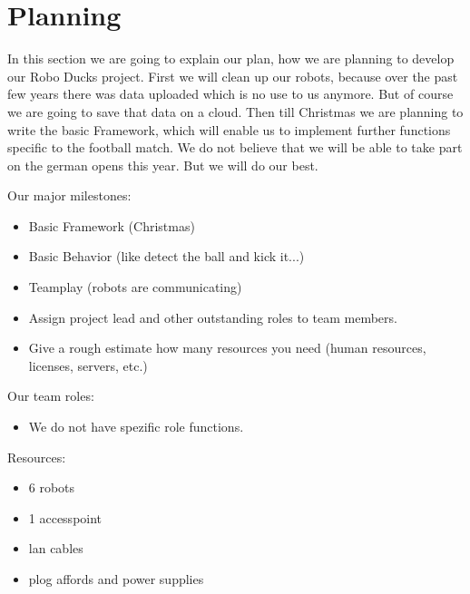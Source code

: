 \documentclass[12pt]{article}
\theoremstyle{definition}
\begin{document}
\pagebreak
\section{Planning}

In this section we are going to explain our plan, how we are planning to develop our Robo Ducks project. First we will clean up our robots, because over the past few years there was data uploaded which is no use to us anymore. But of course we are going to save that data on a cloud. 
Then till Christmas we are planning to write the basic Framework, which will enable us to implement further functions specific to the football match. We do not believe that we will be able to take part on the german opens this year. But we will do our best. \newline

Our major milestones:\newline
\begin{itemize}
\item Basic Framework (Christmas)
\item Basic Behavior (like detect the ball and kick it...)
\item Teamplay (robots are communicating)
\item Assign project lead and other outstanding roles to team members.
\item Give a rough estimate how many resources you need (human resources, licenses, servers, etc.)
\end{itemize}


Our team roles:
\begin{itemize}
\item We do not have spezific role functions. 
\end{itemize}

\pagebreak

Resources:
\begin{itemize}
\item 6 robots
\item 1 accesspoint
\item lan cables
\item plog affords and power supplies
\end{itemize}
\end{document}
